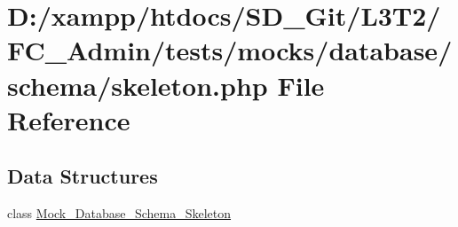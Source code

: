 \hypertarget{skeleton_8php}{}\section{D\+:/xampp/htdocs/\+S\+D\+\_\+\+Git/\+L3\+T2/\+F\+C\+\_\+\+Admin/tests/mocks/database/schema/skeleton.php File Reference}
\label{skeleton_8php}
\subsection*{Data Structures}
\begin{DoxyCompactItemize}
\item 
class \hyperlink{class_mock___database___schema___skeleton}{Mock\+\_\+\+Database\+\_\+\+Schema\+\_\+\+Skeleton}
\end{DoxyCompactItemize}
